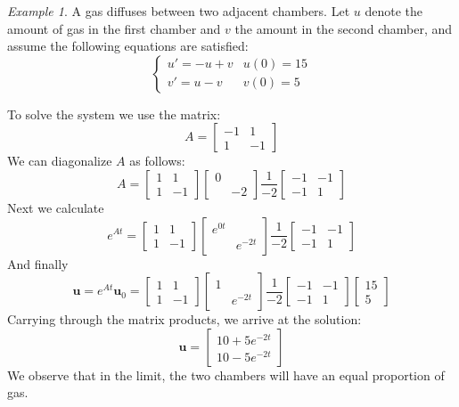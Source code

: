 \documentclass[11pt,oneside]{amsbook}
\theoremstyle{definition}
\theoremstyle{plain}
\theoremstyle{definition}
\theoremstyle{remark}
\newtheorem{example}[theorem]{Example}
\numberwithin{equation}{section}
\numberwithin{figure}{section}
\begin{document}
\begin{example}
  A gas diffuses between two adjacent chambers. Let $u$ denote the amount of gas in the first chamber and $v$ the amount in the second chamber, and assume the following equations are satisfied:
  \[\begin{cases}
      u'=-u+v & u(0)=15\\
      v'=u-v & v(0)=5
    \end{cases}
  \]
  
  To solve the system we use the matrix:
  \[A=\begin{bmatrix}-1&1\\1&-1\end{bmatrix}
  \]
  We can diagonalize $A$ as follows:
  \[A=\begin{bmatrix}1&1\\1&-1\end{bmatrix}
      \begin{bmatrix}0\\&-2\end{bmatrix}
      \frac{1}{-2}
      \begin{bmatrix}-1&-1\\-1&1\end{bmatrix}
  \]
  Next we calculate
  \[e^{At}=\begin{bmatrix}1&1\\1&-1\end{bmatrix}
    \begin{bmatrix}e^{0t}\\&e^{-2t}\end{bmatrix}
    \frac{1}{-2}
    \begin{bmatrix}-1&-1\\-1&1\end{bmatrix}
  \]
  And finally
  \[\bm{u}=e^{At}\bm{u}_0
    =\begin{bmatrix}1&1\\1&-1\end{bmatrix}
    \begin{bmatrix}1\\&e^{-2t}\end{bmatrix}
    \frac{1}{-2}
    \begin{bmatrix}-1&-1\\-1&1\end{bmatrix}
    \begin{bmatrix}15\\5\end{bmatrix}
  \]
  Carrying through the matrix products, we arrive at the solution:
  \[\bm{u}
    =\begin{bmatrix}10+5e^{-2t}\\10-5e^{-2t}\end{bmatrix}
  \]
  We observe that in the limit, the two chambers will have an equal proportion of gas.
\end{example}
\end{document}
